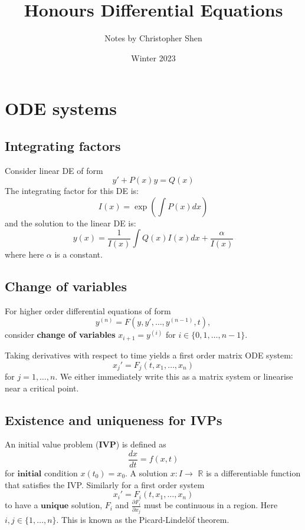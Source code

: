 \documentclass{article}
\title{Honours Differential Equations}
\author{Notes by Christopher Shen}
\date{Winter 2023}
\begin{document}
\maketitle
\newpage

\tableofcontents
\newpage

\pagestyle{fancy}
\fancyhead{}

\section{ODE systems}

\subsection{Integrating factors}
Consider linear DE of form
$$y'+P(x)y=Q(x)$$
The integrating factor for this DE is:
$$I(x)=\exp\left(\int P(x)dx\right)$$
and the solution to the linear DE is:
$$y(x)=\frac{1}{I(x)} \int Q(x)I(x)dx + \frac{\alpha}{I(x)}$$
where here $\alpha$ is a constant.

\subsection{Change of variables}
For higher order differential equations of form $$y^{(n)} = F(y, y', \dots, y^{(n-1)}, t),$$
consider \textbf{change of variables} $x_{i+1} = y^{(i)}$ for $i \in \{0, 1, \dots, n-1\}$.

Taking derivatives with respect to time yields a first order matrix ODE system:
$$x_{j}'=F_j(t, x_1, \dots, x_n)$$ for $j=1, \dots, n$.
We either immediately write this as a matrix system or linearise near a critical point.

\subsection{Existence and uniqueness for IVPs}
An initial value problem ($\textbf{IVP}$) is defined as
$$\frac{dx}{dt} = f(x, t)$$ for $\textbf{initial}$ condition $x(t_0)=x_0$.
A solution $x:I \rightarrow$ $\mathbb{R}$ is a differentiable function that satisfies the IVP.
Similarly for a first order system $$x_{i}'=F_i(t, x_1, \dots, x_n)$$ to have a $\textbf{unique}$ solution,
$F_i$ and $\frac{\partial F_i}{\partial x_j}$
must be continuous in a region. Here $i, j \in \{1, \dots, n\}$.
This is known as the Picard-Lindel{\"o}f theorem. 

\newpage
\end{document}
